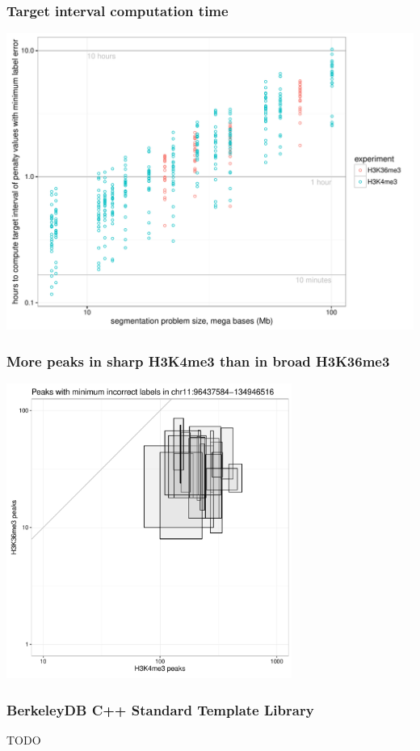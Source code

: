 \documentclass{beamer}
\begin{document}
\begin{frame}
  \frametitle{Target interval computation time}
  \includegraphics[width=\textwidth]{figure-target-interval-time}
\end{frame}

\begin{frame}
  \frametitle{More peaks in sharp H3K4me3 than in broad H3K36me3}
  \includegraphics[width=0.7\textwidth]{figure-min-err-peaks-compare}
\end{frame}

\begin{frame}
  \frametitle{BerkeleyDB C++ Standard Template Library}
  TODO
\end{frame}
\end{document}
